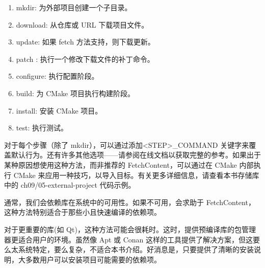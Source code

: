 \begin{enumerate}
\item
mkdir: 为外部项目创建一个子目录。

\item
download: 从仓库或 URL 下载项目文件。

\item
update: 如果 fetch 方法支持，则下载更新。

\item
patch : 执行一个修改下载文件的补丁命令。

\item
configure: 执行配置阶段。

\item
build: 为 CMake 项目执行构建阶段。

\item
install: 安装 CMake 项目。

\item
test: 执行测试。
\end{enumerate}

对于每个步骤（除了 mkdir），可以通过添加<STEP>\_COMMAND 关键字来覆盖默认行为。还有许多其他选项——请参阅在线文档以获取完整的参考。如果出于某种原因想使用这种方法，而非推荐的 FetchContent，可以通过在 CMake 内部执行 CMake 来应用一种技巧，以导入目标。有关更多详细信息，请查看本书存储库中的 ch09/05-external-project 代码示例。

通常，我们会依赖库在系统中的可用性。如果不可用，会求助于 FetchContent，这种方法特别适合于那些小且快速编译的依赖项。

对于更重要的库(如 Qt)，这种方法可能会很耗时。这时，提供预编译库的包管理器更适合用户的环境。虽然像 Apt 或 Conan 这样的工具提供了解决方案，但这要么太系统特定，要么复杂，不适合本书介绍。好消息是，只要提供了清晰的安装说明，大多数用户可以安装项目可能需要的依赖项。





